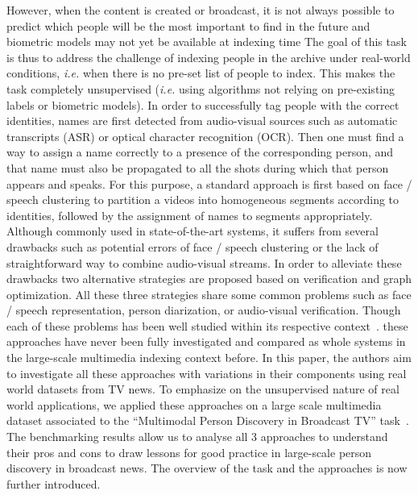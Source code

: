 However, when the content is created or broadcast, it is not always possible to predict which people will be the most important to find in the future and biometric models may not yet be available at indexing time The goal of this task is thus to address the challenge of indexing people in the archive under real-world conditions, \emph{i.e.} when there is no pre-set list of people to index.
%
This makes the task completely unsupervised (\emph{i.e.} using algorithms not relying on pre-existing labels or biometric models).
%
In order to successfully tag people with the correct identities, names are first detected from audio-visual sources such as automatic transcripts (ASR) or optical character recognition (OCR). Then one must find a way to assign a name correctly to a presence of the corresponding person, and that name must also be propagated to all the shots during which that person appears and speaks. 
%
For this purpose, a standard approach is first based on face / speech clustering to partition a videos into homogeneous segments according to identities, followed by the assignment of names to segments appropriately.
%
Although commonly used in state-of-the-art systems\cite{nam2015, gravier2015, 1 more from repere}, it suffers from several drawbacks such as potential errors of face / speech clustering or the lack of straightforward way to combine audio-visual streams.
%
In order to alleviate these drawbacks %
two alternative strategies are proposed based on verification and graph optimization. 
%
All these three strategies share some common problems such as face / speech representation, person diarization, or audio-visual verification. Though each of these problems has been well studied within its respective context~\cite{recog,veri,rep}. 
%
these approaches have never been fully investigated and compared as whole systems in the large-scale multimedia indexing context before. In this paper, the authors aim to investigate all these approaches with variations in their components using real world datasets from TV news. 
%
To emphasize on the unsupervised nature of real world applications, we applied these approaches on a large scale multimedia dataset associated to the ``Multimodal Person Discovery in Broadcast TV'' task~\cite{POIGNANT--MEDIAEVAL--2015,bredin2016mediaeval}.
%
The benchmarking results allow us to analyse all 3 approaches to understand their pros and cons to draw lessons for good practice in large-scale person discovery in broadcast news.
%
The overview of the task and the approaches is now further introduced.


